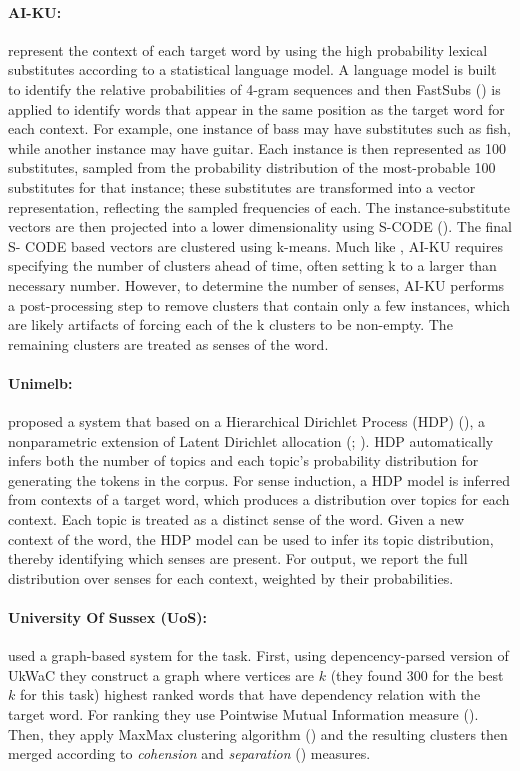 \paragraph{AI-KU:} \cite{baskaya13ai} represent the context of each target word by using the high probability lexical substitutes according to a statistical language model. A language model is built to identify the relative probabilities of 4-gram sequences and then FastSubs (\cite{fastsubs}) is applied to identify words that appear in the same position as the target word for each context. For example, one instance of bass may have substitutes such as fish, while another instance may have guitar. Each instance is then represented as 100 substitutes, sampled from the probability distribution of the most-probable 100 substitutes for that instance; these substitutes are transformed into a vector representation, reflecting the sampled frequencies of each. The instance-substitute vectors are then projected into a lower dimensionality using S-CODE (\cite{Maron2010}). The final S- CODE based vectors are clustered using k-means. Much like \cite{schutze98automatic}, AI-KU requires specifying the number of clusters ahead of time, often setting k to a larger than necessary number. However, to determine the number of senses, AI-KU performs a post-processing step to remove clusters that contain only a few instances, which are likely artifacts of forcing each of the k clusters to be non-empty. The remaining clusters are treated as senses of the word.

\paragraph{Unimelb:} \cite{lau13word} proposed a system that based on a Hierarchical Dirichlet Process (HDP) (\cite{teh06hierarchical}), a nonparametric extension of Latent Dirichlet allocation (\cite{blei03latent}; \cite{steyvers04word}). HDP automatically infers both the number of topics and each topic’s probability distribution for generating the tokens in the corpus. For sense induction, a HDP model is inferred from contexts of a target word, which produces a distribution over topics for each context. Each topic is treated as a distinct sense of the word. Given a new context of the word, the HDP model can be used to infer its topic distribution, thereby identifying which senses are present. For output, we report the full distribution over senses for each context, weighted by their probabilities.

\paragraph{University Of Sussex (UoS):} \cite{hope2013uos} used a graph-based system for the task. First, using depencency-parsed version of UkWaC they construct a graph where vertices are $k$ (they found 300 for the best $k$ for this task) highest ranked words that have dependency relation with the target word. For ranking they use Pointwise Mutual Information measure (\cite{bouma2009pointwise}). Then, they apply MaxMax clustering algorithm (\cite{hope2013maxmax}) and the resulting clusters then merged according to \emph{cohension} and \emph{separation} (\cite{pang2006introduction}) measures.

